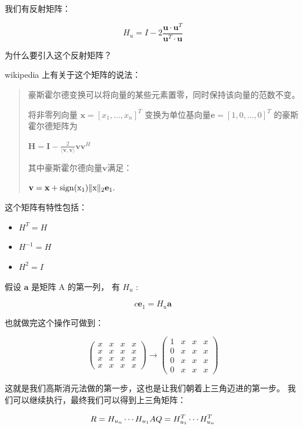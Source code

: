 \documentclass[
]{book}
\providecommand{\tightlist}{%
  \setlength{\itemsep}{0pt}\setlength{\parskip}{0pt}}
\begin{document}
我们有反射矩阵：

\[
H_u = I - 2 {\frac  { \mathbf {u}\cdot \mathbf {u}^T  }{\mathbf {u}^T \cdot \mathbf {u} } } 
\]

为什么要引入这个反射矩阵？

wikipedia 上有关于这个矩阵的说法：

\begin{quote}
豪斯霍尔德变换可以将向量的某些元素置零，同时保持该向量的范数不变。

将非零列向量 \(\mathbf{x}=[x_1,\ldots,x_n ]^T\) 变换为单位基向量\(\mathbf{e}=[1,0,\ldots,0]^T\) 的豪斯霍尔德矩阵为

\(\mathbf{H} = \mathbf{I} - \frac{2}{\langle \mathbf{v},\mathbf{v} \rangle}\mathbf{vv}^H\)

其中豪斯霍尔德向量\(\mathbf{v}\)满足：

\(\mathbf{v} = \mathbf{x} + \rm{sign}(x_1) \Vert x \Vert_2 \mathbf{e}_1 . \,\)
\end{quote}

这个矩阵有特性包括：

\begin{itemize}
\tightlist
\item
  \(H^{T}=H\)
\item
  \(H^{-1}=H\)
\item
  \(H^{2}=I\)
\end{itemize}

假设 \(\mathbf{a}\) 是矩阵 A 的第一列， 有 \(H_u\) :

\[
c\mathbf{e}_1 = H_u \mathbf{a}
\]

也就做完这个操作可做到：

\[
\begin{pmatrix} x & x & x & x\\
x & x & x & x\\
x & x & x & x\\
x & x & x & x \end{pmatrix} \to
\begin{pmatrix} 1 & x & x & x\\
0 & x & x & x\\
0 & x & x & x\\
0 & x & x & x \end{pmatrix} 
\]

这就是我们高斯消元法做的第一步，这也是让我们朝着上三角迈进的第一步。 我们可以继续执行，最终我们可以得到上三角矩阵：

\[
R = H_{u_n} \cdots H_{u_1}A \\
Q = H_{u_1}^T \cdots H_{u_n}^T
\]
\end{document}
